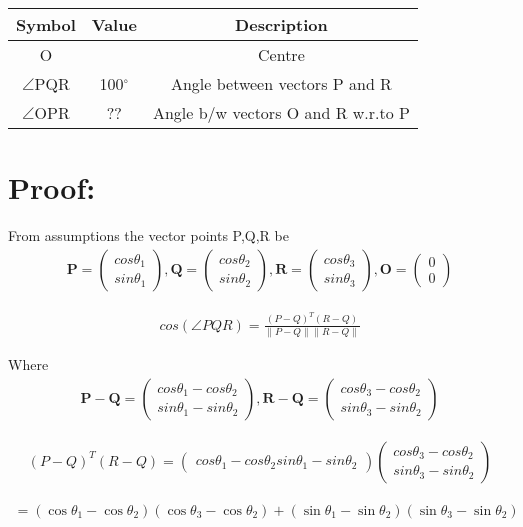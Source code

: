 \documentclass[journal,10pt,twocolumn]{article}
\providecommand{\norm}[1]{\left\lVert#1\right\rVert}
\let\vec\mathbf
\newcommand{\myvec}[1]{\ensuremath{\begin{pmatrix}#1\end{pmatrix}}}
\begin{document}
{
\setlength\extrarowheight{1pt}


\begin{tabular}{|c|c|c|}
 \hline
 \textbf{Symbol}&\textbf{Value}&\textbf{Description}\\
 \hline
 O&&Centre\\
 \hline
 $\angle$PQR&100$^\circ$&Angle between vectors P and R\\
 \hline
 $\angle$OPR&??&Angle b/w vectors O and R w.r.to P\\
 \hline
 
\end{tabular}

{


\section*{Proof:}
From assumptions the vector points P,Q,R be
\begin{eqnarray}
 \vec{P} = \myvec{cos\theta_1\\sin\theta_1},
 \vec{Q} = \myvec{cos\theta_2\\sin\theta_2},
 \vec{R} = \myvec{cos\theta_3\\sin\theta_3},
 \vec{O} = \myvec{0\\0}
\end{eqnarray}

\begin{align}
 cos(\angle PQR) = \frac{(P-Q)^T(R-Q)}{\norm{P-Q}\norm{R-Q}}
 \label{pf2-eq-1}
\end{align}

Where
 \begin{eqnarray}
 \vec{P-Q} = \myvec{cos\theta_1 - cos\theta_2\\sin\theta_1 - sin\theta_2},
 \vec{R-Q} = \myvec{cos\theta_3 - cos\theta_2\\sin\theta_3 - sin\theta_2}
\end{eqnarray}
 

\begin{eqnarray*}
 (P-Q)^T(R-Q)=\myvec{cos\theta_1 - cos\theta_2  sin\theta_1 - sin\theta_2}
 \myvec{cos\theta_3 - cos\theta_2\\sin\theta_3 - sin\theta_2}
\end{eqnarray*}

\begin{multline*}
 = (\cos\theta_1-\cos\theta_2)(\cos\theta_3-\cos\theta_2)+(\sin\theta_1-\sin\theta_2)(\sin\theta_3-\sin\theta_2)
\end{multline*}

}}
\end{document}
